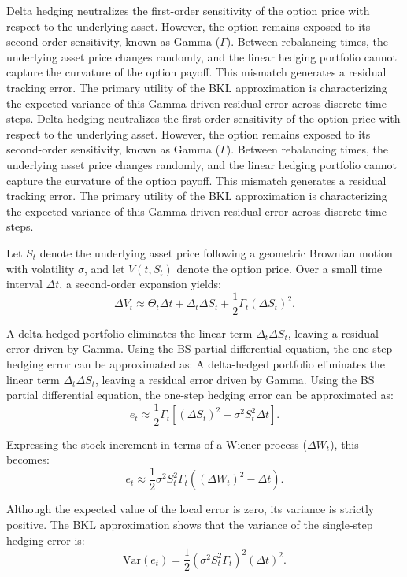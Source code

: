 \documentclass{article}
\begin{document}
Delta hedging neutralizes the first-order sensitivity of the option price with respect to the underlying asset. However, the option remains exposed to its second-order sensitivity, known as Gamma ($\Gamma$). Between rebalancing times, the underlying asset price changes randomly, and the linear hedging portfolio cannot capture the curvature of the option payoff. This mismatch generates a residual tracking error. The primary utility of the BKL approximation is characterizing the expected variance of this Gamma-driven residual error across discrete time steps.
Delta hedging neutralizes the first-order sensitivity of the option price with respect to the underlying asset. However, the option remains exposed to its second-order sensitivity, known as Gamma ($\Gamma$). Between rebalancing times, the underlying asset price changes randomly, and the linear hedging portfolio cannot capture the curvature of the option payoff. This mismatch generates a residual tracking error. The primary utility of the BKL approximation is characterizing the expected variance of this Gamma-driven residual error across discrete time steps.


Let $S_t$ denote the underlying asset price following a geometric Brownian motion with volatility $\sigma$, and let $V(t,S_t)$ denote the option price. Over a small time interval $\Delta t$, a second-order expansion yields:
\[
\Delta V_t \approx \Theta_t \Delta t + \Delta_t \Delta S_t + \frac{1}{2} \Gamma_t (\Delta S_t)^2.
\]

A delta-hedged portfolio eliminates the linear term $\Delta_t \Delta S_t$, leaving a residual error driven by Gamma. Using the BS partial differential equation, the one-step hedging error can be approximated as:
A delta-hedged portfolio eliminates the linear term $\Delta_t \Delta S_t$, leaving a residual error driven by Gamma. Using the BS partial differential equation, the one-step hedging error can be approximated as:
\[
e_t \approx \frac{1}{2} \Gamma_t \left[ (\Delta S_t)^2 - \sigma^2 S_t^2 \Delta t \right].
\]

Expressing the stock increment in terms of a Wiener process ($\Delta W_t$), this becomes:
\[
e_t \approx \frac{1}{2} \sigma^2 S_t^2 \Gamma_t \left( (\Delta W_t)^2 - \Delta t \right).
\]

Although the expected value of the local error is zero, its variance is strictly positive. The BKL approximation shows that the variance of the single-step hedging error is:
\[
\text{Var}(e_t) = \frac{1}{2} \left( \sigma^2 S_t^2 \Gamma_t \right)^2 (\Delta t)^2.
\]
\end{document}
